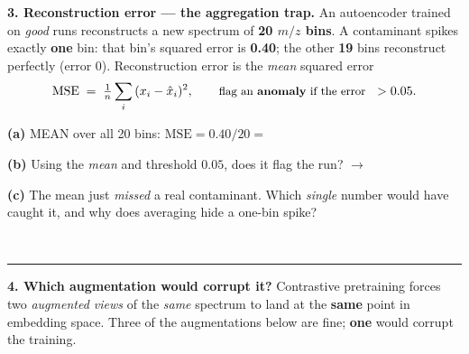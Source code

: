 \documentclass[11pt]{article}
\newif\ifsolution
\newcommand{\blk}[1]{\underline{\hspace{#1}}}
\newcommand{\rb}[2]{\ifsolution\textbf{#1}\else\blk{#2}\fi}
\newcommand{\keybox}[1]{\ifsolution\par\vspace{2pt}%
  \fbox{\parbox{0.965\textwidth}{\small\textbf{Answer.}\; #1}}\par\fi}
\newcommand{\work}[1]{\ifsolution\else\vspace{#1}\fi}
\begin{document}
\textbf{3. Reconstruction error --- the aggregation trap.}\; {\small An autoencoder trained on
\emph{good} runs reconstructs a new spectrum of \textbf{20 $m/z$ bins}. A contaminant spikes
exactly \textbf{one} bin: that bin's squared error is \textbf{0.40}; the other \textbf{19} bins
reconstruct perfectly (error 0). Reconstruction error is the \emph{mean} squared error}
\[
  \text{MSE} \;=\; \tfrac{1}{n}\sum_{i}\,(x_i-\hat{x}_i)^2 ,
  \qquad\text{{\small flag an \textbf{anomaly} if the error } } > 0.05 .
\]

\vspace{2pt}
\textbf{(a)} MEAN over all 20 bins: $\text{MSE} = 0.40 / 20 = $ \rb{$0.02$}{2.0cm}

\work{0.4cm}

\textbf{(b)} Using the \emph{mean} and threshold $0.05$, does it flag the run?
\hfill $\rightarrow$\; \rb{no --- $0.02 < 0.05$, it PASSES}{5.4cm}

\work{0.4cm}

\textbf{(c)} The mean just \emph{missed} a real contaminant. Which \emph{single} number would have
caught it, and why does averaging hide a one-bin spike?

\work{1.1cm}
\ifsolution\else\blk{\linewidth}\\[6pt]\blk{\linewidth}\fi

\keybox{(a) $\text{MSE}=0.40/20=\mathbf{0.02}$. (b) \textbf{No} --- $0.02 < 0.05$, so the mean-MSE
\textbf{passes} the run and the contaminant slips through. (c) The \textbf{MAX per-bin error}
($0.40 > 0.05$), or the error inside the peak window, would flag it. The mean divides one big
error across 20 bins, so a \emph{localized} spike is diluted below threshold --- over thousands of
real $m/z$ bins a single contaminant peak can vanish into the average. Lesson: match the anomaly
\emph{score} to the anomaly's shape, and set the threshold as the same sensitivity/specificity
dial as Lecture~10.}

\vspace{2pt}\hrule\vspace{5pt}

\textbf{4. Which augmentation would corrupt it?}\; {\small Contrastive pretraining forces two
\emph{augmented views} of the \emph{same} spectrum to land at the \textbf{same} point in embedding
space. Three of the augmentations below are fine; \textbf{one} would corrupt the training.}
\end{document}
